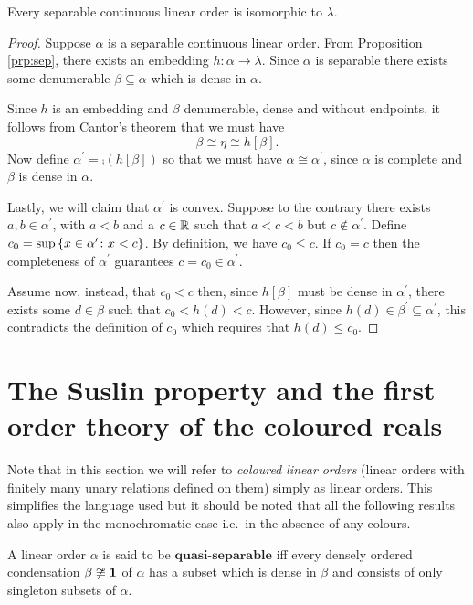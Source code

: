 \begin{thm}\label{thm:rchar}
	Every separable continuous linear order is isomorphic to $\lambda$.
\end{thm}
\begin{proof}
	Suppose $\alpha$ is a separable continuous linear order.  From Proposition
	\ref{prp:sep}, there exists an embedding $h\colon\alpha\to\lambda$.  Since
	$\alpha$ is separable there exists some denumerable $\beta\subseteq\alpha$
	which is dense in $\alpha$.

	Since $h$ is an embedding and $\beta$ denumerable, dense and without
	endpoints, it follows from Cantor's theorem that we must have
	\begin{equation}
		\beta\cong\eta\cong h[\beta].
	\end{equation}
	Now define $\alpha^\prime=\comp(h[\beta])$ so that we must have
	$\alpha\cong\alpha^\prime$, since $\alpha$ is complete and $\beta$ is dense in
	$\alpha$.

	Lastly, we will claim that $\alpha^\prime$ is convex.  Suppose to the
	contrary there exists $a,b\in\alpha^\prime$, with $a<b$ and a $c\in\mathbb{R}$ such
	that $a<c<b$ but $c\notin\alpha^\prime$.  Define
	$c_0=\sup\left\lbrace x\in\alpha^\prime\colon x<c \right\rbrace$. By definition, we have $c_0\leq c$.
	If $c_0=c$ then the completeness of $\alpha^\prime$ guarantees
	$c=c_0\in\alpha^\prime$.

	Assume now, instead, that $c_0<c$ then, since $h[\beta]$ must be dense in
	$\alpha^\prime$, there exists some $d\in\beta$ such that $c_0<h(d)<c$.  However,
	since $h(d)\in\beta^\prime\subseteq\alpha^\prime$, this contradicts the
	definition of $c_0$ which requires that $h(d)\leq c_0$.
\end{proof}


\section{The Suslin property and the first order theory of the coloured reals}

Note that in this section we will refer to \textit{coloured linear orders}
(linear orders with finitely many unary relations defined on them) simply as
linear orders.  This simplifies the language used but it should be noted that
all the following results also apply in the monochromatic case i.e.\ in the
absence of any colours.

\begin{dfn}\label{dfn:quasiseparable}
	A linear order $\alpha$ is said to be $\textbf{quasi-separable}$ iff every
	densely ordered condensation $\beta\not\cong\mathbf{1}$ of $\alpha$ has a subset which
	is dense in $\beta$ and consists of only singleton subsets of $\alpha$.
\end{dfn}

